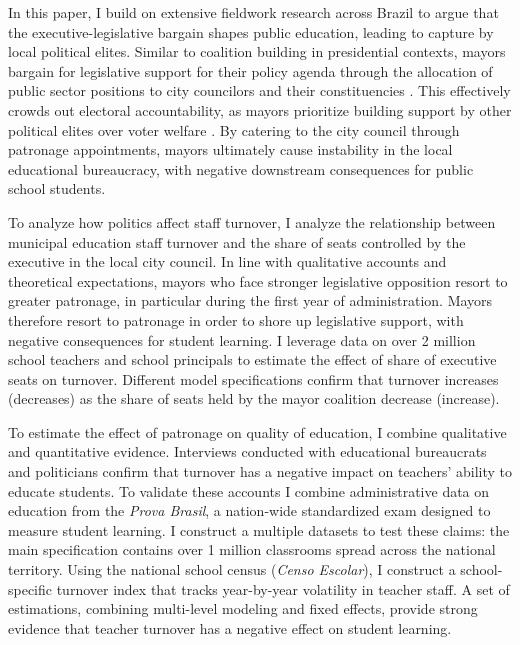 \documentclass[12pt,a4paper]{article}
\begin{document}
In this paper, I build on extensive fieldwork research across Brazil to argue that the executive-legislative bargain shapes public education, leading to capture by local political elites. Similar to coalition building in presidential contexts, mayors bargain for legislative support for their policy agenda through the allocation of public sector positions to city councilors and their constituencies \citep{laver_coalitions_1990, power_optimism_2010}. This effectively crowds out electoral accountability, as mayors prioritize building support by other political elites over voter welfare \citep{ferejohn_incumbent_1986}. By catering to the city council through patronage appointments, mayors ultimately cause instability in the local educational bureaucracy, with negative downstream consequences for public school students.

To analyze how politics affect staff turnover, I analyze the relationship between municipal education staff turnover and the share of seats controlled by the executive in the local city council. In line with qualitative accounts and theoretical expectations, mayors who face stronger legislative opposition resort to greater patronage, in particular during the first year of administration. Mayors therefore resort to patronage in order to shore up legislative support, with negative consequences for student learning. I leverage data on over 2 million school teachers and school principals to estimate the effect of share of executive seats on turnover. Different model specifications confirm that turnover increases (decreases) as the share of seats held by the mayor coalition decrease (increase).

To estimate the effect of patronage on quality of education, I combine qualitative and quantitative evidence. Interviews conducted with educational bureaucrats and politicians confirm that turnover has a negative impact on teachers' ability to educate students. To validate these accounts I combine administrative data on education from the \emph{Prova Brasil}, a nation-wide standardized exam designed to measure student learning. I construct a multiple datasets to test these claims: the main specification contains over 1 million classrooms spread across the national territory. Using the national school census (\emph{Censo Escolar}), I construct a school-specific turnover index that tracks year-by-year volatility in teacher staff. A set of estimations, combining multi-level modeling and fixed effects, provide strong evidence that teacher turnover has a negative effect on student learning.
\end{document}
